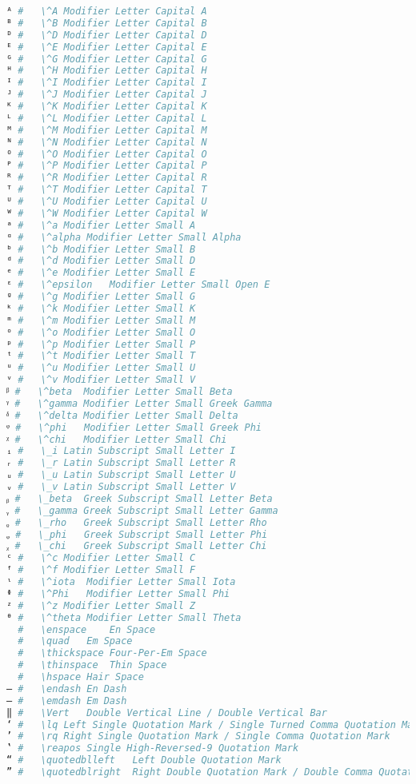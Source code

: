 \begin{lstlisting}[language=Julia, style=julia, linewidth=\textwidth]
ᴬ #   \^A Modifier Letter Capital A
ᴮ #   \^B Modifier Letter Capital B
ᴰ #   \^D Modifier Letter Capital D
ᴱ #   \^E Modifier Letter Capital E
ᴳ #   \^G Modifier Letter Capital G
ᴴ #   \^H Modifier Letter Capital H
ᴵ #   \^I Modifier Letter Capital I
ᴶ #   \^J Modifier Letter Capital J
ᴷ #   \^K Modifier Letter Capital K
ᴸ #   \^L Modifier Letter Capital L
ᴹ #   \^M Modifier Letter Capital M
ᴺ #   \^N Modifier Letter Capital N
ᴼ #   \^O Modifier Letter Capital O
ᴾ #   \^P Modifier Letter Capital P
ᴿ #   \^R Modifier Letter Capital R
ᵀ #   \^T Modifier Letter Capital T
ᵁ #   \^U Modifier Letter Capital U
ᵂ #   \^W Modifier Letter Capital W
ᵃ #   \^a Modifier Letter Small A
ᵅ #   \^alpha Modifier Letter Small Alpha
ᵇ #   \^b Modifier Letter Small B
ᵈ #   \^d Modifier Letter Small D
ᵉ #   \^e Modifier Letter Small E
ᵋ #   \^epsilon   Modifier Letter Small Open E
ᵍ #   \^g Modifier Letter Small G
ᵏ #   \^k Modifier Letter Small K
ᵐ #   \^m Modifier Letter Small M
ᵒ #   \^o Modifier Letter Small O
ᵖ #   \^p Modifier Letter Small P
ᵗ #   \^t Modifier Letter Small T
ᵘ #   \^u Modifier Letter Small U
ᵛ #   \^v Modifier Letter Small V
ᵝ #   \^beta  Modifier Letter Small Beta
ᵞ #   \^gamma Modifier Letter Small Greek Gamma
ᵟ #   \^delta Modifier Letter Small Delta
ᵠ #   \^phi   Modifier Letter Small Greek Phi
ᵡ #   \^chi   Modifier Letter Small Chi
ᵢ #   \_i Latin Subscript Small Letter I
ᵣ #   \_r Latin Subscript Small Letter R
ᵤ #   \_u Latin Subscript Small Letter U
ᵥ #   \_v Latin Subscript Small Letter V
ᵦ #   \_beta  Greek Subscript Small Letter Beta
ᵧ #   \_gamma Greek Subscript Small Letter Gamma
ᵨ #   \_rho   Greek Subscript Small Letter Rho
ᵩ #   \_phi   Greek Subscript Small Letter Phi
ᵪ #   \_chi   Greek Subscript Small Letter Chi
ᶜ #   \^c Modifier Letter Small C
ᶠ #   \^f Modifier Letter Small F
ᶥ #   \^iota  Modifier Letter Small Iota
ᶲ #   \^Phi   Modifier Letter Small Phi
ᶻ #   \^z Modifier Letter Small Z
ᶿ #   \^theta Modifier Letter Small Theta
  #   \enspace    En Space
  #   \quad   Em Space
  #   \thickspace Four-Per-Em Space
  #   \thinspace  Thin Space
  #   \hspace Hair Space
– #   \endash En Dash
— #   \emdash Em Dash
‖ #   \Vert   Double Vertical Line / Double Vertical Bar
‘ #   \lq Left Single Quotation Mark / Single Turned Comma Quotation Mark
’ #   \rq Right Single Quotation Mark / Single Comma Quotation Mark
‛ #   \reapos Single High-Reversed-9 Quotation Mark
“ #   \quotedblleft   Left Double Quotation Mark
” #   \quotedblright  Right Double Quotation Mark / Double Comma Quotation Mark

\end{lstlisting}
